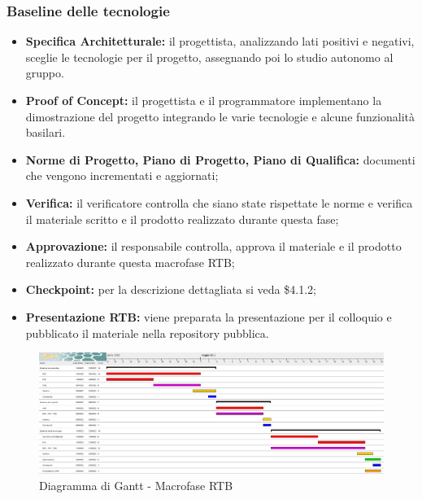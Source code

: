 \subsubsection{Baseline delle tecnologie}
\begin{itemize}
    \item \textbf{Specifica Architetturale:} il progettista, analizzando lati positivi e negativi, sceglie le tecnologie per il progetto, assegnando poi lo studio autonomo al gruppo.
    \item \textbf{Proof of Concept:} il progettista e il programmatore implementano la dimostrazione del progetto integrando le varie tecnologie e alcune funzionalità basilari.
    \item \textbf{Norme di Progetto, Piano di Progetto, Piano di Qualifica:} documenti che vengono incrementati e aggiornati;
    \item \textbf{Verifica:} il verificatore controlla che siano state rispettate le norme e verifica il materiale scritto e il prodotto realizzato durante questa fase;
    \item \textbf{Approvazione:} il responsabile controlla, approva il materiale e il prodotto realizzato durante questa macrofase RTB;
    \item \textbf{Checkpoint:} per la descrizione dettagliata si veda \$4.1.2;
    \item \textbf{Presentazione RTB:} viene preparata la presentazione per il colloquio e pubblicato il materiale nella repository pubblica.
\end{itemize}


\begin{landscape}
	\begin{figure}
	\includegraphics[width=\linewidth]{images/RTB.png}
    \caption{Diagramma di Gantt - Macrofase RTB}
	\end{figure}
\end{landscape}